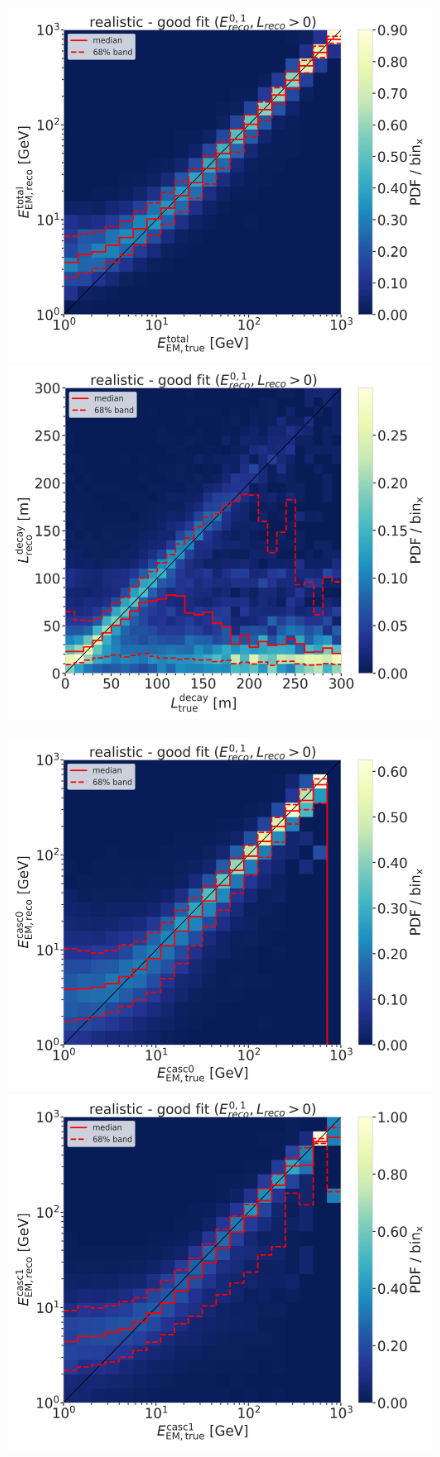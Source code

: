 \begin{figure}[h]
	\centering
    \includegraphics[width=0.49\linewidth]{figures/model_independent_simulation/results/realistic/2d_hists/194603_reco_total_energy_vs_true_total_energy_goodfit_step_contours.png}
    \includegraphics[width=0.49\linewidth]{figures/model_independent_simulation/results/realistic/2d_hists/194603_reco_decay_length_vs_true_decay_length_goodfit_step_contours.png}
    \caption[]{}
\end{figure}

\begin{figure}[h]
	\centering
    \includegraphics[width=0.49\linewidth]{figures/model_independent_simulation/results/realistic/2d_hists/194603_casc0_reco_energy_vs_casc0_true_energy_goodfit_step_contours.png}
    \includegraphics[width=0.49\linewidth]{figures/model_independent_simulation/results/realistic/2d_hists/194603_casc1_reco_energy_vs_casc1_true_energy_goodfit_step_contours.png}
    \caption[]{}
\end{figure}


